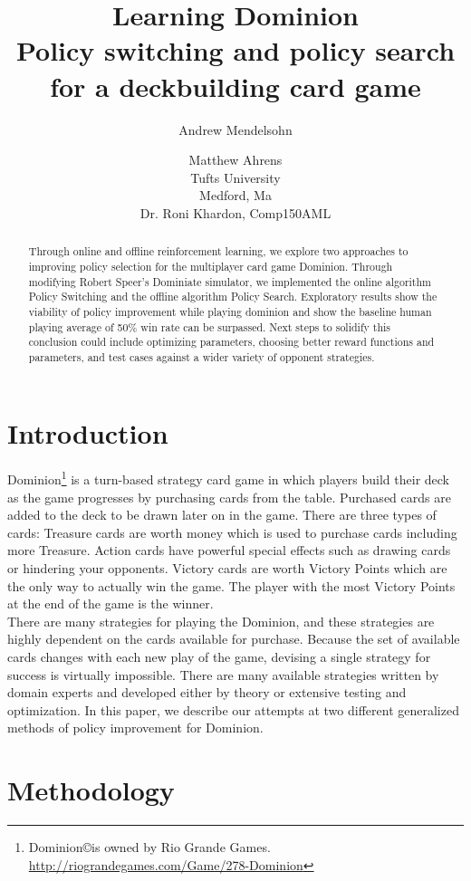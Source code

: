 \documentclass{article}
\title{Learning Dominion \\ Policy switching and policy search for a deckbuilding card game}
\author{Andrew Mendelsohn \and Matthew Ahrens\\
Tufts University\\
Medford, Ma \\
Dr. Roni Khardon, Comp150AML
}
\begin{document}
\maketitle

\begin{abstract}
  Through online and offline reinforcement learning, we explore two approaches to improving policy selection for the multiplayer card game Dominion. Through modifying Robert Speer's Dominiate simulator, we implemented the online algorithm Policy Switching and the offline algorithm Policy Search. Exploratory results show the viability of policy improvement while playing dominion and show the baseline human playing average of 50\% win rate can be surpassed. Next steps to solidify this conclusion could include optimizing parameters, choosing better reward functions and parameters, and test cases against a wider variety of opponent strategies.
\end{abstract}

\section{Introduction}

Dominion\footnote{Dominion\copyright is owned by Rio Grande Games. \url{http://riograndegames.com/Game/278-Dominion}} is a turn-based strategy card game in which players build their deck as the game progresses by purchasing cards from the table. Purchased cards are added to the deck to be drawn later on in the game. There are three types of cards: Treasure cards are worth money which is used to purchase cards including more Treasure. Action cards have powerful special effects such as drawing cards or hindering your opponents. Victory cards are worth Victory Points which are the only way to actually win the game. The player with the most Victory Points at the end of the game is the winner.
\\
There are many strategies for playing the Dominion, and these strategies are highly dependent on the cards available for purchase. Because the set of available cards changes with each new play of the game, devising a single strategy for success is virtually impossible. There are many available strategies written by domain experts and developed either by theory or extensive testing and optimization. In this paper, we describe our attempts at two different generalized methods of policy improvement for Dominion.
\section{Methodology}
\end{document}
